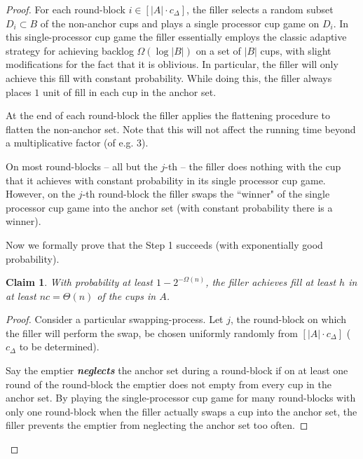 \documentclass[twocolumn]{article}[10pt]
\newcommand{\defn}[1]{{\textit{\textbf{\boldmath #1}}}\xspace}
\newtheorem{clm}{Claim}
\begin{document}
\begin{proof}
For each round-block $i\in [|A|\cdot c_\Delta]$, the filler selects a random subset
$D_i\subset B$ of the non-anchor cups and plays a single processor cup game on
$D_i$. In this single-processor cup game the filler essentially employs the
classic adaptive strategy for achieving backlog $\Omega(\log |B|)$ on a set of
$|B|$ cups, with slight modifications for the fact that it is oblivious. In
particular, the filler will only achieve this fill with constant probability.
While doing this, the filler always places $1$ unit of fill in each cup in the
anchor set. 

At the end of each round-block the filler applies the flattening procedure to
flatten the non-anchor set. Note that this will not affect the running time beyond a
multiplicative factor (of e.g. $3$). 

On most round-blocks -- all but the $j$-th -- the filler does nothing with the
cup that it achieves with constant probability in its single processor cup
game. However, on the $j$-th round-block the filler swaps the ``winner" of the
single processor cup game into the anchor set (with constant probability there
is a winner).

Now we formally prove that the Step 1 succeeds (with exponentially good probability).

\begin{clm} \label{clm:reg} 
  With probability at least $1-2^{-\Omega(n)}$, the filler achieves fill
  at least $h$ in at least $nc = \Theta(n)$ of the cups in $A$. 
\end{clm}
\begin{proof}
  Consider a particular swapping-process. Let $j$, the round-block on which the
  filler will perform the swap, be chosen uniformly randomly from $[|A|\cdot
  c_\Delta]$ ($c_\Delta$ to be determined).
 
  Say the emptier \defn{neglects} the anchor set during a round-block if on at
  least one round of the round-block the emptier does not empty from every cup
  in the anchor set. By playing the single-processor cup game for many
  round-blocks with only one round-block when the filler actually swaps a cup
  into the anchor set, the filler prevents the emptier from neglecting the
  anchor set too often.


\end{proof}
\end{proof}
\end{document}
